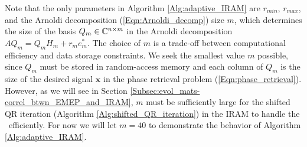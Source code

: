 Note that the only parameters in Algorithm \ref{Alg:adaptive_IRAM} are $r_{min}$, $r_{max}$, and the Arnoldi decomposition (\ref{Eqn:Arnoldi_decomp}) size $m$, which determines the size of the basis $Q_m \in {\mathbb C}^{n \times m}$ in the Arnoldi decomposition $AQ_m = Q_mH_m + r_me_m^*$.  
The choice of $m$ is a trade-off between computational efficiency and data storage constraints.
We seek the smallest value $m$ possible, since $Q_m$ must be stored in random-access memory and each column of $Q_m$ is the size of the desired signal $\mathbf{x}$ in the phase retrieval problem (\ref{Eqn:phase_retrieval}).
However, as we will see in Section \ref{Subsec:evol_mats-correl_btwn_EMEP_and_IRAM}, $m$ must be sufficiently large for the shifted QR iteration (Algorithm \ref{Alg:shifted_QR_iteration}) in the IRAM to handle the \emep \ efficiently.  
For now we will let $m=40$ to demonstrate the behavior of Algorithm \ref{Alg:adaptive_IRAM}.



